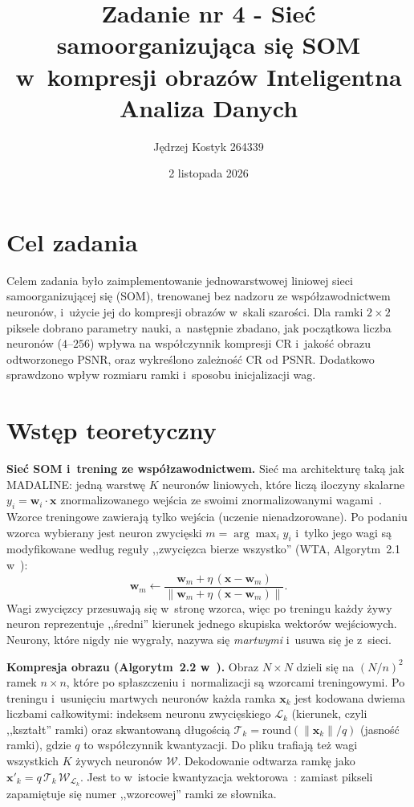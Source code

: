 \documentclass[12pt]{article}
\title{{\bf Zadanie nr 4 - Sieć samoorganizująca się SOM w~kompresji obrazów}\linebreak
Inteligentna Analiza Danych}
\author{Jędrzej Kostyk 264339}
\date{2 listopada 2026}
\begin{document}
\clearpage\maketitle
\thispagestyle{empty}
\newpage
\setcounter{page}{1}
\section{Cel zadania}

Celem zadania było zaimplementowanie jednowarstwowej liniowej sieci samoorganizującej się (SOM),
trenowanej bez nadzoru ze współzawodnictwem neuronów, i~użycie jej do kompresji obrazów
w~skali szarości. Dla ramki $2\times2$ piksele dobrano parametry nauki, a~następnie zbadano,
jak początkowa liczba neuronów ($4$--$256$) wpływa na współczynnik kompresji CR i~jakość obrazu
odtworzonego PSNR, oraz wykreślono zależność CR od PSNR. Dodatkowo sprawdzono wpływ rozmiaru
ramki i~sposobu inicjalizacji wag.

\section{Wstęp teoretyczny}

\textbf{Sieć SOM i~trening ze współzawodnictwem.} Sieć ma architekturę taką jak MADALINE: jedną
warstwę $K$ neuronów liniowych, które liczą iloczyny skalarne $y_i=\mathbf{w}_i\cdot\mathbf{x}$
znormalizowanego wejścia ze swoimi znormalizowanymi wagami~\cite{wyklad3,kohonen1990}. Wzorce
treningowe zawierają tylko wejścia (uczenie nienadzorowane). Po podaniu wzorca wybierany jest
neuron zwycięski $m=\arg\max_i y_i$ i~tylko jego wagi są modyfikowane według reguły
,,zwycięzca bierze wszystko'' (WTA, Algorytm~2.1 w~\cite{wyklad3}):
\begin{equation}
 \mathbf{w}_m \leftarrow \frac{\mathbf{w}_m+\eta\,(\mathbf{x}-\mathbf{w}_m)}{\|\mathbf{w}_m+\eta\,(\mathbf{x}-\mathbf{w}_m)\|} .
 \label{eq_som}
\end{equation}
Wagi zwycięzcy przesuwają się w~stronę wzorca, więc po treningu każdy żywy neuron reprezentuje
,,średni'' kierunek jednego skupiska wektorów wejściowych. Neurony, które nigdy nie wygrały,
nazywa się \emph{martwymi} i~usuwa się je z~sieci.

\textbf{Kompresja obrazu (Algorytm~2.2 w~\cite{wyklad3}).} Obraz $N\times N$ dzieli się na
$(N/n)^2$ ramek $n\times n$, które po spłaszczeniu i~normalizacji są wzorcami treningowymi.
Po treningu i~usunięciu martwych neuronów każda ramka $\mathbf{x}_k$ jest kodowana dwiema liczbami
całkowitymi: indeksem neuronu zwycięskiego $\mathcal{L}_k$ (kierunek, czyli ,,kształt'' ramki) oraz
skwantowaną długością $\mathcal{T}_k=\mathrm{round}(\|\mathbf{x}_k\|/q)$ (jasność ramki), gdzie $q$ to
współczynnik kwantyzacji. Do pliku trafiają też wagi wszystkich $K$ żywych neuronów $\mathcal{W}$.
Dekodowanie odtwarza ramkę jako $\mathbf{x}'_k=q\,\mathcal{T}_k\,\mathcal{W}_{\mathcal{L}_k}$. Jest to
w~istocie kwantyzacja wektorowa~\cite{gray1984}: zamiast pikseli zapamiętuje się numer ,,wzorcowej''
ramki ze słownika.
\end{document}

